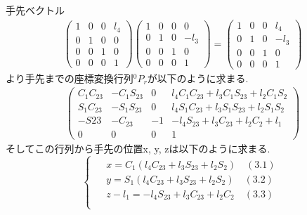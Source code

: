 \documentclass[a4j]{jarticle}			%
\begin{document}
\begin{multicols}{2}
手先ベクトル
\tiny
\begin{equation*}
	\begin{array}{cccc}
		\left( 
			\begin{array}{cccc}
				1 & 0 & 0 & l_4\\
				0 & 1 & 0 & 0\\
				0 & 0 & 1 & 0\\
				0 & 0 & 0 & 1 
			\end{array}
		\right)
		\left( 
			\begin{array}{cccc}
				1 & 0 & 0 & 0\\
				0 & 1 & 0 & -l_3\\
				0 & 0 & 1 & 0\\
				0 & 0 & 0 & 1 
			\end{array}
			\right)
		=
		\left( 
		\begin{array}{cccc}
			1 & 0 & 0 & l_4\\
			0 & 1 & 0 & -l_3\\
			0 & 0 & 1 & 0\\
			0 & 0 & 0 & 1 
		\end{array}
		\right)
	\end{array}
\end{equation*}
\small
より手先までの座標変換行列$^{0}P_{r}$が以下のように求まる.
\tiny
\begin{equation*}
	\begin{array}{cc}
		\left( 
			\begin{array}{cccc}
				C_1C_{23} & -C_1S_{23} & 0 & l_4C_1C_{23}+l_3C_1S_{23}+l_2C_1S_2 \\
				S_1C_{23} & -S_1S_{23} & 0 & l_4S_1C_{23}+l_3S_1S_{23}+l_2S_1S_2 \\
				-S{23} & -C_{23} & -1 & -l_4S_{23}+l_3C_{23}+l_2C_2+l_1 \\
				0 & 0 & 0 & 1 
			\end{array}
		\right)
	\end{array}
\end{equation*}
\small
そしてこの行列から手先の位置x, y, zは以下のように求まる.
\begin{equation*}
	\left\{
		\begin{array}{c}
		\begin{split}
			&x=C_1(l_4C_{23}+l_3S_{23}+l_2S_2)\quad(3.1) \\
			&y=S_1(l_4C_{23}+l_3S_{23}+l_2S_2)\quad(3.2) \\
			&z-l_1=-l_4S_{23}+l_3C_{23}+l_2C_2\quad(3.3) \\
		\end{split}

\end{array}
\end{equation*}
\end{multicols}
\end{document}
